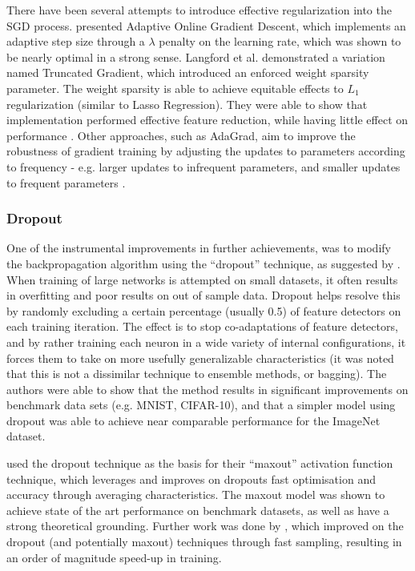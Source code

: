 \documentclass[a4paper,11pt,oneside]{article}
\theoremstyle{plain}
\theoremstyle{definition}
\begin{document}
	There have been several attempts to introduce effective regularization into the SGD process. \citet{Bartlett} 
	presented Adaptive Online Gradient Descent, which implements an adaptive step size through a $\lambda$ 
	penalty on the learning rate, which was shown to be nearly optimal in a strong sense. Langford et al. 
	demonstrated a variation named Truncated Gradient, which introduced an enforced weight sparsity parameter. 
	The weight sparsity is able to achieve equitable effects to $L_1$ regularization (similar to Lasso Regression). 
	They were able to show that implementation performed effective feature reduction, while having little effect on 
	performance \citep{Langford}. Other approaches, such as AdaGrad, aim to improve the robustness of gradient training by 
	adjusting the updates to parameters according to frequency - e.g. larger updates to infrequent parameters, and 
	smaller updates to frequent parameters \citep{Duchi, Zeiler}. 
	\hfill\break
	
	\subsubsection{Dropout}
	
	One of the instrumental improvements in further achievements, was to modify the backpropagation 
	algorithm using the ``dropout'' technique, as suggested by \citet{Hinton4}. When training of large networks is 
	attempted on small datasets, it often results in overfitting and poor results on out of sample data. Dropout helps 
	resolve this by randomly excluding a certain percentage (usually 0.5) of feature detectors on each training iteration. 
	The effect is to stop co-adaptations of feature detectors, and by rather training each neuron in a wide variety of 
	internal configurations, it forces them to take on more usefully generalizable characteristics (it was noted that this
	is not a dissimilar technique to ensemble methods, or bagging). The authors were able to show that the method
	results in significant improvements on benchmark data sets (e.g. MNIST, CIFAR-10), and that a simpler model 
	using dropout was able to achieve near comparable performance for the ImageNet dataset.
	\hfill \break 
	
	\citet{Goodfellow} used the dropout technique as the basis for their ``maxout'' activation function technique, which 
	leverages and improves on dropout\textsc{}s fast optimisation and accuracy through averaging characteristics. The 
	maxout model was shown to achieve state of the art performance on benchmark datasets, as well as have a 
	strong theoretical grounding. Further work was done by \citet{Wang2}, which improved on the dropout 
	(and potentially maxout) techniques through fast sampling, resulting in an order of magnitude speed-up in
	training.
	\hfill \break 
	
\end{document}
